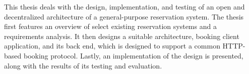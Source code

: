 This thesis deals with the design, implementation, and testing of an open and decentralized architecture of a general-purpose reservation system. The thesis first features an overview of select existing reservation systems and a requirements analysis. It then designs a suitable architecture, booking client application, and its back end, which is designed to support a common HTTP-based booking protocol. Lastly, an implementation of the design is presented, along with the results of its testing and evaluation.

